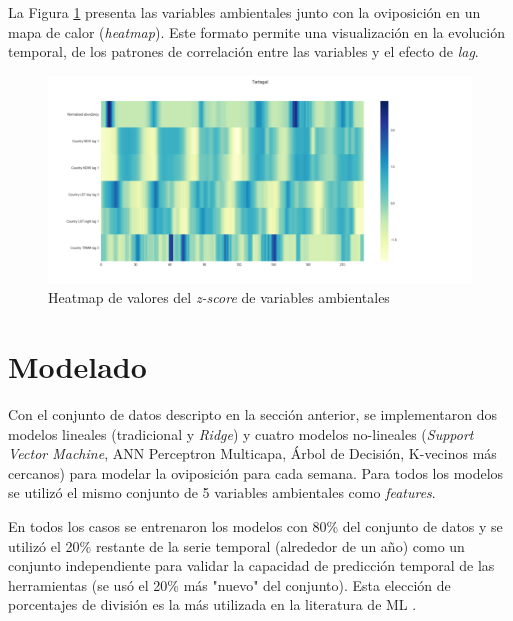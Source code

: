   \par La Figura \ref{fig:heatmap} presenta las variables ambientales junto
    con la oviposición en un mapa de calor (\textit{heatmap}). Este formato
    permite una visualización en la evolución temporal, de los
    patrones de correlación entre las variables y el efecto de \textit{lag}.

    \begin{figure}[hbt]
    \centering%
    \includegraphics[width=1\textwidth]{images/heatmap}%
    \caption{Heatmap de valores del \textit{z-score} de variables ambientales}\label{fig:heatmap}
    \end{figure}



\section{Modelado}

  \par Con el conjunto de datos descripto en la sección anterior, se implementaron
    dos modelos lineales (tradicional y \textit{Ridge}) y cuatro modelos
    no-lineales (\textit{Support Vector Machine}, ANN Perceptron Multicapa,
    Árbol de Decisión, K-vecinos más cercanos) para modelar la oviposición
    para cada semana. Para todos los modelos se utilizó el mismo conjunto de
    5 variables ambientales como \textit{features}.

  \par En todos los casos se entrenaron los modelos con 80\% del conjunto de
    datos y se utilizó el 20\% restante de la serie temporal (alrededor de un año)
    como un conjunto independiente para validar la capacidad de predicción temporal
    de las herramientas (se usó el 20\% más "nuevo" del conjunto). Esta elección
    de porcentajes de división es la más utilizada en la literatura de ML \cite{ml_rainfall}.

